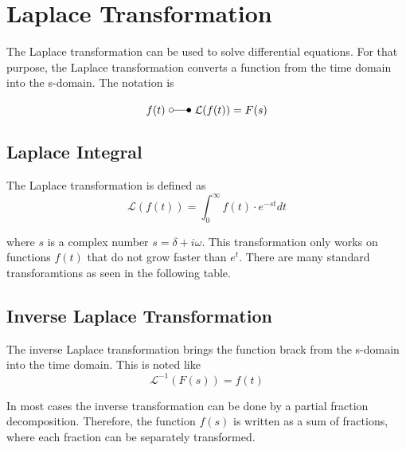 \documentclass[./\jobname.tex]{subfiles}
\begin{document}
\chapter{Laplace Transformation}

The Laplace transformation can be used to solve differential equations. For that purpose, the Laplace transformation converts a function from the time domain into the s-domain.
The notation is 

\begin{equation}
	f(t) \text{ } \laplace \text{ } \mathcal{L}(f(t)) = F(s)
\end{equation}

\section{Laplace Integral}
The Laplace transformation is defined as 
\begin{equation}
	\mathcal{L} \left( f(t) \right) = \int_{0}^{\infty} f(t) \cdot e^{-st} dt
\end{equation}

where $s$ is a complex number $s = \delta + i \omega$. This transformation only works on functions $f(t)$ that do not grow faster than $e^t$. There are many standard transforamtions as seen in the following table. 

\section{Inverse Laplace Transformation}
The inverse Laplace transformation brings the function brack from the s-domain into the time domain. This is noted like 
\begin{equation}
	\mathcal{L}^{-1} \left(F(s)\right) = f(t)
\end{equation}

In most cases the inverse transformation can be done by a partial fraction decomposition. Therefore, the function $f(s)$ is written as a sum of fractions, where each fraction can be separately transformed. 
\end{document}
